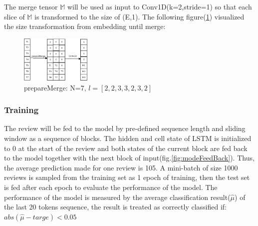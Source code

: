\documentclass[12pt]{article}
\begin{document}
The merge tensor $\mathbb{M}$ will be used as input to Conv1D(k=2,stride=1) so that each slice of $\mathbb{M}$ is transformed to the size of (E,1). The following figure(\ref{fig:prepareMerge}) visualized the size transformation from embedding until merge:
\begin{figure} [!h]
\begin{center}
\includegraphics[width=0.3\textwidth]{figures/prepareMerge.png}
\caption{prepareMerge: N=7, $l=[2,2,3,3,2,3,2]$}
\label{fig:prepareMerge}
\end{center}
\end{figure}


\subsubsection{Training}
The review will be fed to the model by pre-defined sequence length and sliding window as a sequence of blocks. The hidden and cell state of LSTM is initialized to 0 at the start of the review and both states of the current block are fed back to the model together with the next block of input(fig.\ref{fig:modeFeedBack}). Thus, the average prediction made for one review is 105. A mini-batch of size 1000 reviews is sampled from the training set as 1 epoch of training, then the test set is fed after each epoch to evaluate the performance of the model. The performance of the model is measured by the average classification result($\hat{\mu}$) of the last 20 tokens sequence, the result is treated as correctly classified if:\\
$abs(\hat{\mu}-targe)<0.05$
   
\end{document}
